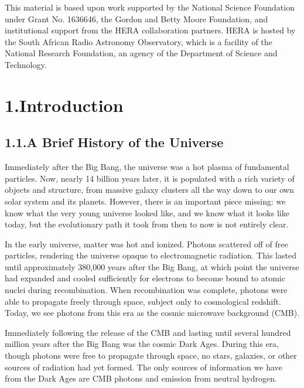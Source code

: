 \documentclass[12pt]{article}
\begin{document}
This material is based upon work supported by the National Science Foundation under Grant No. 1636646, the Gordon and Betty Moore Foundation, and institutional support from the HERA collaboration partners. HERA is hosted by the South African Radio Astronomy Observatory, which is a facility of the National Research Foundation, an agency of the Department of Science and Technology.

\clearpage
{}

\tocless\section{\hypertarget{sec:introduction}{1.\hspace{0.75em}Introduction}}

\tocless\subsection{\hypertarget{subsec:universe}{1.1.\hspace{0.75em}A Brief History of the Universe}}

Immediately after the Big Bang, the universe was a hot plasma of fundamental particles. Now, nearly 14 billion years later, it is populated with a rich variety of objects and structure, from massive galaxy clusters all the way down to our own solar system and its planets. However, there is an important piece missing: we know what the very young universe looked like, and we know what it looks like today, but the evolutionary path it took from then to now is not entirely clear.

In the early universe, matter was hot and ionized. Photons scattered off of free particles, rendering the universe opaque to electromagnetic radiation. This lasted until approximately 380,000 years after the Big Bang, at which point the universe had expanded and cooled sufficiently for electrons to become bound to atomic nuclei during recombination. When recombination was complete, photons were able to propagate freely through space, subject only to cosmological redshift. Today, we see photons from this era as the cosmic microwave background (CMB).

Immediately following the release of the CMB and lasting until several hundred million years after the Big Bang was the cosmic Dark Ages. During this era, though photons were free to propagate through space, no stars, galaxies, or other sources of radiation had yet formed. The only sources of information we have from the Dark Ages are CMB photons and emission from neutral hydrogen.
\end{document}
